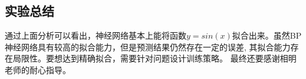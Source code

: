 \documentclass{article}
\begin{document}
\begin{CJK}{UTF8}{gkai}
\section{实验总结}
通过上面分析可以看出，神经网络基本上能将函数$y=sin(x)$拟合出来。虽然BP神经网络具有较高的拟合能力，但是预测结果仍然存在一定的误差, 其拟合能力存在局限性。要想达到精确拟合，需要针对问题设计训练策略。
最终还要感谢相明老师的耐心指导。

{\small
	
	
}
\end{CJK}
\end{document}
